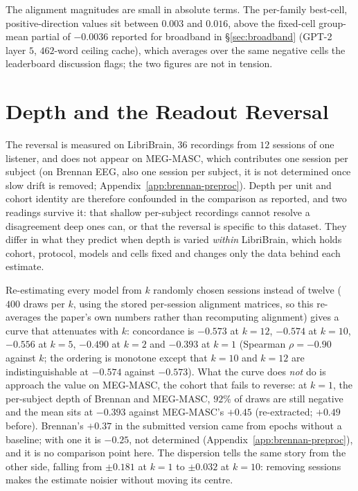 \documentclass{article}
\begin{document}
The alignment magnitudes are small in absolute terms. The per-family best-cell, positive-direction
values sit between $0.003$ and $0.016$, above the fixed-cell group-mean partial of $-0.0036$
reported for broadband in \S\ref{sec:broadband} (GPT-2 layer $5$, $462$-word ceiling cache), which averages over the same negative cells the
leaderboard discussion flags; the two figures are not in tension.

\section{Depth and the Readout Reversal}\label{app:depth}

The reversal is measured on LibriBrain, $36$ recordings from $12$ sessions of one listener, and does not appear on
MEG-MASC, which contributes one session per subject (on Brennan EEG, also one session per subject, it is not
determined once slow drift is removed; Appendix~\ref{app:brennan-preproc}). Depth per unit and cohort identity are therefore
confounded in the comparison as reported, and two readings survive it: that shallow per-subject
recordings cannot resolve a disagreement deep ones can, or that the reversal is specific to this
dataset. They differ in what they predict when depth is varied \emph{within} LibriBrain, which
holds cohort, protocol, models and cells fixed and changes only the data behind each estimate.

Re-estimating every model from $k$ randomly chosen sessions instead of twelve ($400$ draws per
$k$, using the stored per-session alignment matrices, so this re-averages the paper's own numbers
rather than recomputing alignment) gives a curve that attenuates with $k$: concordance is
$-0.573$ at $k=12$, $-0.574$ at $k=10$, $-0.556$ at $k=5$, $-0.490$ at $k=2$ and $-0.393$ at
$k=1$ (Spearman $\rho = -0.90$ against $k$; the ordering is monotone except that $k=10$ and
$k=12$ are indistinguishable at $-0.574$ against $-0.573$). What the curve does \emph{not} do is
approach the value on MEG-MASC, the cohort that fails to reverse: at $k=1$, the per-subject depth of
Brennan and MEG-MASC, $92\%$ of draws are still negative and the mean sits at $-0.393$ against
MEG-MASC's $+0.45$ (re-extracted; $+0.49$ before). Brennan's $+0.37$ in the submitted version came
from epochs without a baseline; with one it is $-0.25$, not determined
(Appendix~\ref{app:brennan-preproc}), and it is no comparison point here. The dispersion tells the same story from the other
side, falling from $\pm 0.181$ at $k=1$ to $\pm 0.032$ at $k=10$: removing sessions makes the
estimate noisier without moving its centre.
\end{document}
